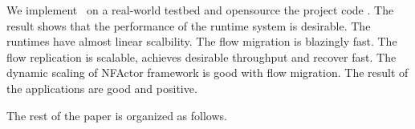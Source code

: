 We implement \nfactor~on a real-world testbed and opensource the project code \cite{projectcode} .  The result shows that the performance of the runtime system is desirable. The runtimes have almost linear scalbility. The flow migration is blazingly fast. The flow replication is scalable, achieves desirable throughput and recover fast. The dynamic scaling of NFActor framework is good with flow migration. The result of the applications are good and positive.


The rest of the paper is organized as follows.  %








